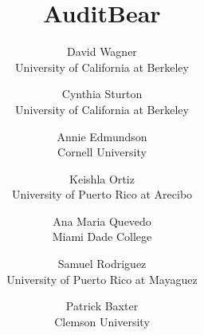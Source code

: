 \documentclass[letterpaper,twocolumn,10pt]{article}
\begin{document}
\title{AuditBear}
\author{
{\rm David Wagner}\\
University of California at Berkeley
\and 
{\rm Cynthia Sturton}\\
University of California at Berkeley
\and 
{\rm Annie Edmundson}\\
Cornell University
\and 
{\rm Keishla Ortiz}\\
University of Puerto Rico at Arecibo
\and 
{\rm Ana Maria Quevedo}\\
Miami Dade College
\and 
{\rm Samuel Rodriguez}\\
University of Puerto Rico at Mayaguez
\and 
{\rm Patrick Baxter}\\
Clemson University
}
\maketitle









{\footnotesize
}


\end{document}
